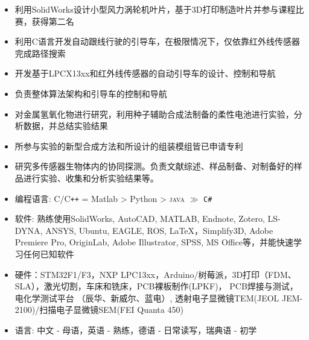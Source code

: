 \begin{itemize}
\small 
  \item 利用SolidWorks设计小型风力涡轮机叶片，基于3D打印制造叶片并参与课程比赛，获得第二名
\end{itemize}

\begin{itemize}
\small 
  \item 利用C语言开发自动跟线行驶的引导车，在极限情况下，仅依靠红外线传感器完成路径搜索
  \item 开发基于LPCX13xx和红外线传感器的自动引导车的设计、控制和导航
  \item 负责整体算法架构和引导车的控制和导航
\end{itemize}

\begin{itemize}
\small 
  \item 对金属氢氧化物进行研究，利用种子辅助合成法制备的柔性电池进行实验，分析数据，并总结实验结果
  \item 所参与实验的新型合成方法和所设计的组装模组皆已申请专利
\end{itemize}

\begin{itemize}
\small
  \item 研究多传感器生物体内的协同探测。负责文献综述、样品制备、对制备好的样品进行实验、收集和分析实验结果等。
\end{itemize}

{}
\begin{itemize}[parsep=0.5ex]
  \item 编程语言: C/C\texttt{++} = Matlab > Python > \textsc{java} $\gg$ \texttt{C\#}
  \item 软件: 熟练使用SolidWorks, AutoCAD, MATLAB, Endnote, Zotero, LS-DYNA, ANSYS, Ubuntu, EAGLE, ROS, \LaTeX，Simplify3D, Adobe Premiere Pro, OriginLab, Adobe Illustrator, SPSS, MS Office等，并能快速学习任何已知软件
  \item 硬件：STM32F1/F3，NXP LPC13xx，Arduino/树莓派，3D打印（FDM、SLA），激光切割，车床和铣床，PCB裸板制作(LPKF)， PCB焊接与测试，电化学测试平台 （辰华、新威尔、蓝电）, 透射电子显微镜TEM(JEOL JEM-2100)/扫描电子显微镜SEM(FEI Quanta 450)
  \item 语言: 中文 - 母语，英语 - 熟练，德语 - 日常读写，瑞典语 - 初学
\end{itemize}

